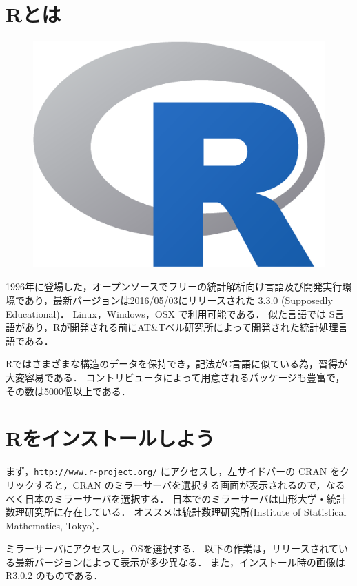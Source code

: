 \section{Rとは}
\begin{figure}
\centering
\vspace{-2em}
\includegraphics[width=38truemm]{img/Rlogo.eps}
\vspace{-1em}
\end{figure}
1996年に登場した，オープンソースでフリーの統計解析向け言語及び開発実行環境であり，最新バージョンは2016/05/03にリリースされた 3.3.0 (Supposedly Educational)．
Linux，Windows，OSX で利用可能である．
似た言語では S言語があり，Rが開発される前にAT\&Tベル研究所によって開発された統計処理言語である．

Rではさまざまな構造のデータを保持でき，記法がC言語に似ている為，習得が大変容易である．
コントリビュータによって用意されるパッケージも豊富で，その数は5000個以上である．

\section{Rをインストールしよう}
まず，{\tt http://www.r-project.org/} にアクセスし，左サイドバーの CRAN をクリックすると，CRAN のミラーサーバを選択する画面が表示されるので，なるべく日本のミラーサーバを選択する．
日本でのミラーサーバは山形大学・統計数理研究所に存在している．
オススメは統計数理研究所(Institute of Statistical Mathematics, Tokyo)．

ミラーサーバにアクセスし，OSを選択する．
以下の作業は，リリースされている最新バージョンによって表示が多少異なる．
また，インストール時の画像は R3.0.2 のものである．

